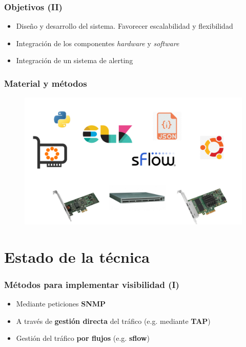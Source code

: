 \documentclass{beamer}
\begin{document}
\begin{frame}
\frametitle{Objetivos (II)}
\begin{itemize}
	\item Diseño y desarrollo del sistema. Favorecer escalabilidad y flexibilidad
	\item Integración de los componentes \textit{hardware} y \textit{software}
	\item Integración de un sistema de alerting
\end{itemize}

\end{frame}


\begin{frame}
\frametitle{Material y métodos}

\begin{figure}[H]
	\centering
	\includegraphics[scale=0.30]{material.png}
	\label{material}
\end{figure}

\end{frame}

\section{Estado de la técnica}


\begin{frame}

\frametitle{Métodos para implementar visibilidad (I)}
\begin{itemize}
	\item Mediante peticiones \textbf{SNMP}
	\item A través de \textbf{gestión directa} del tráfico (e.g. mediante \textbf{TAP})
	\item Gestión del tráfico \textbf{por flujos} (e.g. \textbf{sflow})
\end{itemize}

\end{frame}
\end{document}
